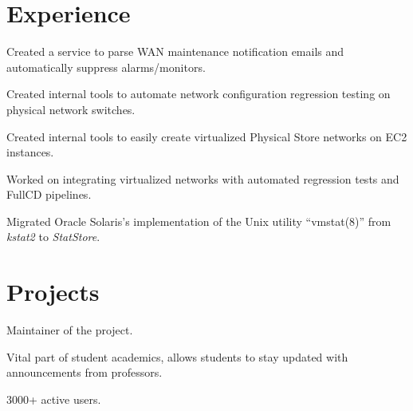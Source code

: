 \documentclass[]{resume}
\begin{document}
\begin{minipage}[t]{0.70\textwidth}

\section{Experience}

\subsectionsep
\begin{tightemize}
\item Created a service to parse WAN maintenance notification emails and
automatically suppress alarms/monitors.
\item Created internal tools to automate network configuration regression
testing on physical network switches.
\item Created internal tools to easily create virtualized Physical Store
networks on EC2 instances.
\item Worked on integrating virtualized networks with automated regression
tests and FullCD pipelines.
\end{tightemize}
\subsectionsep

\begin{tightemize}
\item Migrated Oracle Solaris's implementation of the Unix
utility ``vmstat(8)'' from \textit{kstat2} to \textit{StatStore}.
\end{tightemize}

\section{Projects}
\begin{tightemize}
\item Maintainer of the project.
\item Vital part of student academics, allows students to stay updated with announcements from professors.
\item 3000+ active users.
\end{tightemize}
\subsectionsep


\end{minipage}
\end{document}
